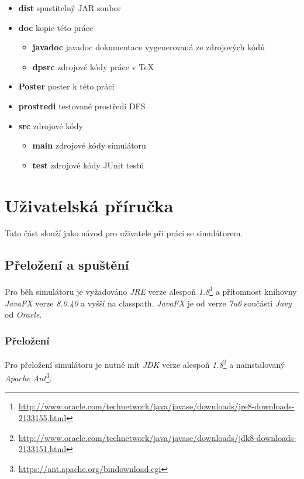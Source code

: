 \documentclass[czech,DP]{thesiskiv}
\begin{document}
\begin{itemize}
\item \textbf{dist} spustitelný JAR soubor
\item \textbf{doc} kopie této práce
	\begin{itemize}
	\item \textbf{javadoc} javadoc dokumentace vygenerovaná ze zdrojových kódů
	\item \textbf{dpsrc} zdrojové kódy práce v \TeX
	\end{itemize}
\item \textbf{Poster} poster k této práci
\item \textbf{prostredi} testované prostředí DFS
\item \textbf{src} zdrojové kódy
	\begin{itemize}
	\item \textbf{main} zdrojové kódy simulátoru
	\item \textbf{test} zdrojové kódy JUnit testů
	\end{itemize}
\end{itemize}

\chapter{Uživatelská příručka}

Tato část slouží jako návod pro uživatele při práci se simulátorem.

\section{Přeložení a spuštění}

Pro běh simulátoru je vyžadováno \textit{JRE} verze alespoň \textit{1.8}\footnote{\url{http://www.oracle.com/technetwork/java/javase/downloads/jre8-downloads-2133155.html}} a přítomnost knihovny \textit{JavaFX} verze \textit{8.0.40} a vyšší na classpath. \textit{JavaFX} je od verze \textit{7u6} součástí \textit{Javy} od \textit{Oracle}.

\subsection{Přeložení}

Pro přeložení simulátoru je nutné mít \textit{JDK} verze alespoň \textit{1.8}\footnote{\url{http://www.oracle.com/technetwork/java/javase/downloads/jdk8-downloads-2133151.html}} a nainstalovaný \textit{Apache Ant}\footnote{\url{https://ant.apache.org/bindownload.cgi}}.
\end{document}
